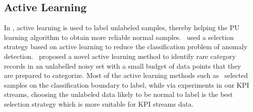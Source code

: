 \subsection{Active Learning}
\label{subsec:active}
In \name{}, active learning is used to label unlabeled samples, thereby helping the PU learning algorithm to obtain more reliable normal samples. ~\cite{Outlieractive}used a selection strategy based on active learning to reduce the classification problem of anomaly detection. ~\cite{Pelleg04activelearning}proposed a novel active learning method to identify rare category records in an unlabelled noisy set with a small budget of data points that they are prepared to categorize. Most of the active learning methods such as~\cite{activelearning2015} selected samples on the classification boundary to label, while via experiments in our KPI streams, choosing the unlabeled data likely to be normal to label is the best selection strategy which is more suitable for KPI streams data.